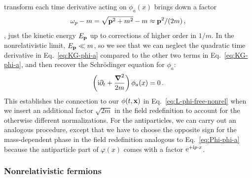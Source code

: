 transform each time derivative acting on $\phi_a(x)$ brings down a factor
%
\begin{equation}
 \omega_p - m = \sqrt{\mathbf{p}^2 + m^2} - m \approx \mathbf{p}^2/(2m) \,,
\end{equation}
%
\ie, just the kinetic energy $E_{\mathbf{p}}$ up to corrections of higher order in 
$1/m$.  In the nonrelativistic limit, $E_{\mathbf{p}} \ll m$, so we see that we can 
neglect the quadratic time derivative in Eq.~\eqref{eq:KG-phi-a} compared to the 
other two terms in Eq.~\eqref{eq:KG-phi-a}, and then recover the Schr\"odinger 
equation for $\phi_a$:
%
\begin{equation}
 \left(\mathrm{i}\partial_t + \frac{\boldsymbol{\nabla}^2}{2m}\right)\phi_a(x) = 0 \,.
\end{equation}
%
This establishes the connection to our $\phi(t,\mathbf{x})$ in 
Eq.~\eqref{eq:L-phi-free-nonrel} when we insert an additional factor 
$\sqrt{2m}$ in the field redefinition to account for the otherwise different 
normalizations.  For the antiparticles, we can carry out an analogous procedure, 
except that we have to choose the opposite sign for the mass-dependent phase in 
the field redefinition analogous to Eq.~\eqref{eq:Phi-phi-a} because the 
antiparticle part of $\varphi(x)$ comes with a factor $\mathrm{e}^{+\mathrm{i} p\cdot x}$.

\subsubsection{Nonrelativistic fermions}
\label{sec:EFT-NonRelFerm}

